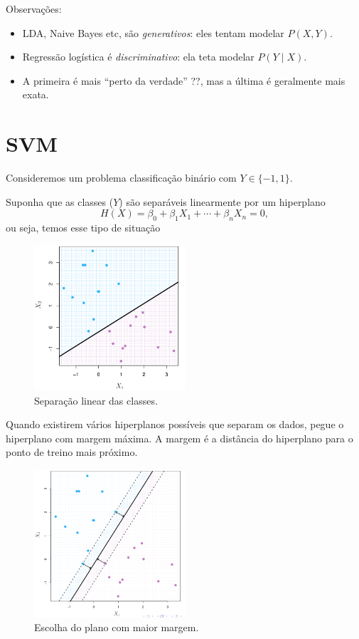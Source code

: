 \documentclass[a4paper,fleqn,12pt]{article}
\begin{document}
Observações:
\begin{itemize}
\item LDA, Naive Bayes etc, são \textit{generativos}: eles tentam modelar $P(X, Y)$.
\item Regressão logística é \textit{discriminativo}: ela teta modelar $P(Y \mid X)$.
\item A primeira é mais ``perto da verdade'' ??, mas a última é geralmente mais exata.
\end{itemize}


\section{SVM}

Consideremos um problema classificação binário com $Y \in \{-1, 1\}$.

Suponha que as classes ($Y$) são separáveis linearmente por um hiperplano
$$
H(X) = \beta_0 + \beta_1 X_1 + \cdots + \beta_n X_n = 0,
$$
ou seja, temos esse tipo de situação
\begin{figure}[H]
\centering
\includegraphics[width=0.5\textwidth]{fig/linear-separable.png}
\caption{Separação linear das classes.}
\label{fig:linear-separable}
\end{figure}

Quando existirem vários hiperplanos possíveis que separam os dados, pegue o hiperplano com margem máxima. A margem é a distância do hiperplano para o ponto de treino mais próximo.
\begin{figure}[H]
\centering
\includegraphics[width=0.5\textwidth]{fig/max-margin.png}
\caption{Escolha do plano com maior margem.}
\label{fig:max-margin}
\end{figure}
\end{document}

